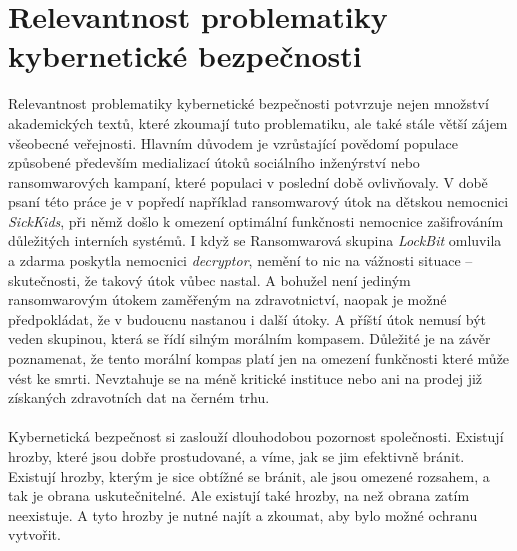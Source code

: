 \section{Relevantnost problematiky kybernetické bezpečnosti}\label{sec:relevance}
Relevantnost problematiky kybernetické bezpečnosti potvrzuje nejen množství akademických textů, které zkoumají tuto problematiku, ale také stále větší zájem všeobecné veřejnosti.
Hlavním důvodem je vzrůstající povědomí populace způsobené především medializací útoků sociálního inženýrství nebo ransomwarových kampaní, které populaci v poslední době ovlivňovaly.
V době psaní této práce je v popředí například ransomwarový útok na dětskou nemocnici \textit{SickKids}, při němž došlo k omezení optimální funkčnosti nemocnice zašifrováním důležitých interních systémů\cite{bleep_sickkids_ransom}.
I když se Ransomwarová skupina \textit{LockBit} omluvila a zdarma poskytla nemocnici \textit{decryptor}, nemění to nic na vážnosti situace – skutečnosti, že takový útok vůbec nastal.
A bohužel není jediným ransomwarovým útokem zaměřeným na zdravotnictví, naopak je možné předpokládat, že v budoucnu nastanou i další útoky.
A příští útok nemusí být veden skupinou, která se řídí silným morálním kompasem.
Důležité je na závěr poznamenat, že tento morální kompas platí jen na omezení funkčnosti které může vést ke smrti.
Nevztahuje se na méně kritické instituce nebo ani na prodej již získaných zdravotních dat na černém trhu.

\paragraph{}
Kybernetická bezpečnost si zaslouží dlouhodobou pozornost společnosti.
Existují hrozby, které jsou dobře prostudované, a víme, jak se jim efektivně bránit.
Existují hrozby, kterým je sice obtížné se bránit, ale jsou omezené rozsahem, a tak je obrana uskutečnitelné.
Ale existují také hrozby, na než obrana zatím neexistuje.
A tyto hrozby je nutné najít a zkoumat, aby bylo možné ochranu vytvořit.

